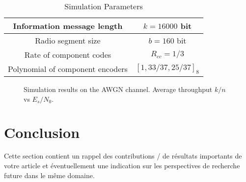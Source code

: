 \documentclass[journal, a4paper]{IEEEtran}
\begin{document}
	\begin{table}[!hbt]
		\begin{center}
		\caption{Simulation Parameters}
		\label{tab:simParameters}
		\begin{tabular}{|c|c|}
			\hline
			Information message length & $k=16000$ bit \\
			\hline
			Radio segment size & $b=160$ bit \\
			\hline
			Rate of component codes & $R_{cc}=1/3$\\
			\hline
			Polynomial of component encoders & $[1 , 33/37 , 25/37]_8$\\
			\hline
		\end{tabular}
		\end{center}
	\end{table}
	
	\begin{figure}[!hbt]
		\begin{center}
		\caption{Simulation results on the AWGN channel. Average throughput $k/n$ vs $E_s/N_0$.}
		\label{fig:tf_plot}
		\end{center}
	\end{figure}

\section{Conclusion}
Cette section contient un rappel des contributions / de résultats importants de votre article et éventuellement une indication sur les perspectives de recherche future dans le même domaine.
\end{document}
